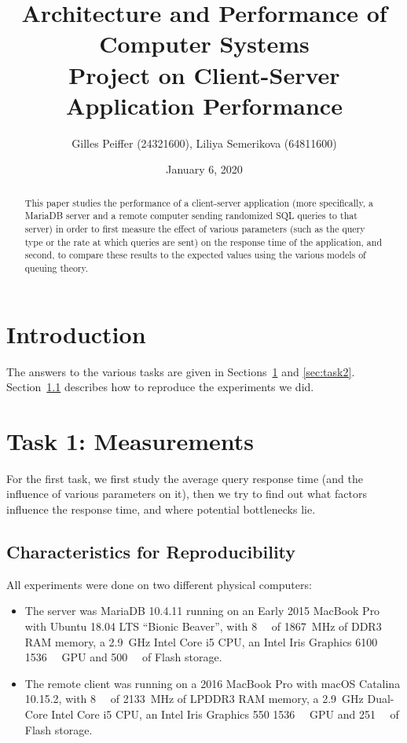 \documentclass[journal]{IEEEtran}
\title{Architecture and Performance of Computer Systems \\ Project on Client-Server Application Performance}
\author{Gilles Peiffer (24321600), Liliya Semerikova (64811600)}
\date{January 6, 2020}
\theoremstyle{definition}
\begin{document}
\maketitle

\begin{abstract}
	This paper studies the performance of a client-server application (more specifically, a MariaDB server and a remote computer sending randomized SQL queries to that server) in order to first measure the effect of various parameters (such as the query type or the rate at which queries are sent) on the response time of the application, and second, to compare these results to the expected values using the various models of queuing theory.
\end{abstract}

\section*{Introduction}
The answers to the various tasks are given in Sections~\ref{sec:task1} and \ref{sec:task2}.
Section~\ref{sec:char} describes how to reproduce the experiments we did.

\section{Task 1: Measurements}
\label{sec:task1}
For the first task, we first study the average query response time (and the influence of various parameters on it), then we try to find out what factors influence the response time, and where potential bottlenecks lie.

\subsection{Characteristics for Reproducibility}
\label{sec:char}
All experiments were done on two different physical computers:
\begin{itemize}
	\item The server was MariaDB 10.4.11 running on an Early 2015 MacBook Pro with Ubuntu 18.04 LTS ``Bionic Beaver'', with \SI{8}{\giga\byte} of \SI{1867}{\mega\hertz} of DDR3 RAM memory, a \SI{2.9}{\giga\hertz} Intel Core i5 CPU, an Intel Iris Graphics 6100 \SI{1536}{\mega\byte} GPU and \SI{500}{\giga\byte} of Flash storage.
	\item The remote client was running on a 2016 MacBook Pro with macOS Catalina 10.15.2, with \SI{8}{\giga\byte} of \SI{2133}{\mega\hertz} of LPDDR3 RAM memory, a \SI{2.9}{\giga\hertz} Dual-Core Intel Core i5 CPU, an Intel Iris Graphics 550 \SI{1536}{\mega\byte} GPU and \SI{251}{\giga\byte} of Flash storage.
\end{itemize}
\end{document}
